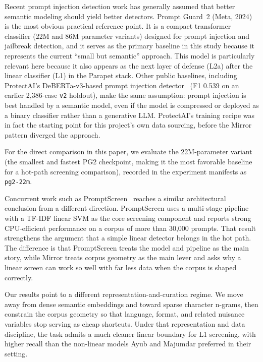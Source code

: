 \documentclass[11pt,a4paper]{article}
\begin{document}
Recent prompt injection detection work has generally assumed that better
semantic modeling should yield better detectors. Prompt Guard~2
(Meta, 2024)~\cite{pg2} is the most obvious practical reference point.
It is a compact transformer classifier (22M and 86M parameter variants)
designed for prompt injection and jailbreak detection, and it serves as
the primary baseline in this study because it represents the current
``small but semantic'' approach. This model is particularly relevant
here because it also appears as the next layer of defense (L2a) after
the linear classifier (L1) in the Parapet stack. Other public baselines,
including ProtectAI's DeBERTa-v3-based prompt injection
detector~\cite{protectai} (F1 0.539 on an earlier 2,386-case
\texttt{v2} holdout), make the same assumption: prompt injection is best
handled by a semantic model, even if the model is compressed or deployed
as a binary classifier rather than a generative LLM. ProtectAI's
training recipe was in fact the starting point for this project's own
data sourcing, before the Mirror pattern diverged the approach.

For the direct comparison in this paper, we evaluate the 22M-parameter
variant (the smallest and fastest PG2 checkpoint, making it the most
favorable baseline for a hot-path screening comparison), recorded in the
experiment manifests as \texttt{pg2-22m}.

Concurrent work such as PromptScreen~\cite{promptscreen} reaches a
similar architectural conclusion from a different direction.
PromptScreen uses a multi-stage pipeline with a TF-IDF linear SVM as
the core screening component and reports strong CPU-efficient
performance on a corpus of more than 30,000 prompts. That result
strengthens the argument that a simple linear detector belongs in the
hot path. The difference is that PromptScreen treats the model and
pipeline as the main story, while Mirror treats corpus geometry as the
main lever and asks why a linear screen can work so well with far less
data when the corpus is shaped correctly.

Our results point to a different representation-and-curation regime. We
move away from dense semantic embeddings and toward sparse character
n-grams, then constrain the corpus geometry so that language, format,
and related nuisance variables stop serving as cheap shortcuts. Under
that representation and data discipline, the task admits a much cleaner
linear boundary for L1 screening, with higher recall than the non-linear
models Ayub and Majumdar preferred in their setting.
\end{document}
